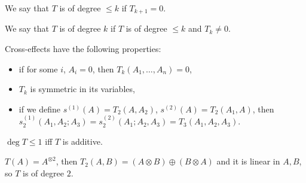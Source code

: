     \begin{definition}
        We say that $T$ is of degree $\leq k$ if $T_{k+1} = 0$.
        
        We say that $T$ is of degree $k$ 
        if $T$ is of degree $\leq k$ and $T_k \neq 0$.
    \end{definition}
    
    \begin{theorem}
        Cross-effects have the following properties:
        \begin{itemize}
            \item if for some $i$, $A_i = 0$, then $T_k(A_1, \ldots, A_n) = 0$,
            \item $T_k$ is symmetric in its variables,
            \item if we define $s^{(1)}(A) = T_2(A,A_2)$,
            $s^{(2)}(A) = T_2(A_1,A)$,
            then \\ 
            $s_2^{(1)}(A_1, A_2; A_3) = s_2^{(2)}(A_1; A_2, A_3) 
            = T_3(A_1,A_2,A_3)$.
        \end{itemize}
    \end{theorem}
    
    \begin{example}
        $\deg T \leq 1$ iff $T$ is additive.
    \end{example}
    
    \begin{example}
        $T(A) = A^{\otimes 2}$,
        then $T_2(A,B) = (A \otimes B) \oplus (B \otimes A)$
        and it is linear in $A,B$, so $T$ is of degree $2$.
    \end{example}




    
    
















 
 